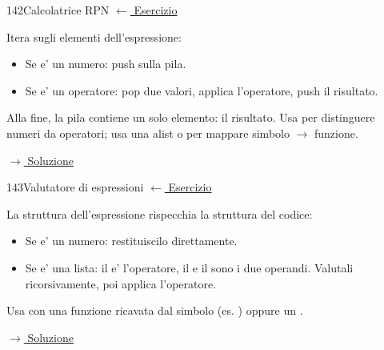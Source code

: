 
\label{hint:142}
\begin{hintbox}{142}{Calcolatrice RPN}
\small\color{black!55}\hyperref[ex:142]{$\leftarrow$ Esercizio}\normalsize\color{black}

Itera sugli elementi dell'espressione:
\begin{itemize}[leftmargin=2em]
  \item Se e' un numero: push sulla pila.
  \item Se e' un operatore: pop due valori, applica
        l'operatore, push il risultato.
\end{itemize}
Alla fine, la pila contiene un solo elemento: il risultato.
Usa  per distinguere numeri da operatori;
usa una alist o  per mappare simbolo $\to$ funzione.

\small\color{black!55}\hyperref[sol:142]{$\rightarrow$ Soluzione}\normalsize\color{black}
\end{hintbox}

\label{hint:143}
\begin{hintbox}{143}{Valutatore di espressioni}
\small\color{black!55}\hyperref[ex:143]{$\leftarrow$ Esercizio}\normalsize\color{black}

La struttura dell'espressione rispecchia la struttura del codice:
\begin{itemize}[leftmargin=2em]
  \item Se e' un numero: restituiscilo direttamente.
  \item Se e' una lista: il  e' l'operatore,
        il  e il  sono i due operandi.
        Valutali ricorsivamente, poi applica l'operatore.
\end{itemize}
Usa  con una funzione ricavata dal simbolo
(es. ) oppure un .

\small\color{black!55}\hyperref[sol:143]{$\rightarrow$ Soluzione}\normalsize\color{black}
\end{hintbox}

